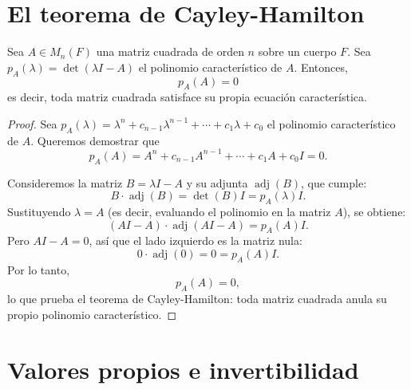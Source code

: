 \section{El teorema de Cayley-Hamilton}

\begin{theorem}
Sea $A \in M_n(F)$ una matriz cuadrada de orden $n$ sobre un cuerpo $F$. Sea $p_A(\lambda) = \det(\lambda I - A)$ el polinomio característico de $A$. Entonces,
\[
p_A(A) = 0
\]
es decir, toda matriz cuadrada satisface su propia ecuación característica.
\end{theorem}

\begin{proof}
Sea $p_A(\lambda) = \lambda^n + c_{n-1}\lambda^{n-1} + \cdots + c_1\lambda + c_0$ el polinomio característico de $A$. Queremos demostrar que
\[
p_A(A) = A^n + c_{n-1}A^{n-1} + \cdots + c_1A + c_0 I = 0.
\]

Consideremos la matriz $B = \lambda I - A$ y su adjunta $\operatorname{adj}(B)$, que cumple:
\[
B \cdot \operatorname{adj}(B) = \det(B) I = p_A(\lambda) I.
\]
Sustituyendo $\lambda = A$ (es decir, evaluando el polinomio en la matriz $A$), se obtiene:
\[
(AI - A) \cdot \operatorname{adj}(AI - A) = p_A(A) I.
\]
Pero $AI - A = 0$, así que el lado izquierdo es la matriz nula:
\[
0 \cdot \operatorname{adj}(0) = 0 = p_A(A) I.
\]
Por lo tanto,
\[
p_A(A) = 0,
\]
lo que prueba el teorema de Cayley-Hamilton: toda matriz cuadrada anula su propio polinomio característico.
\end{proof}


\section{Valores propios e invertibilidad}


